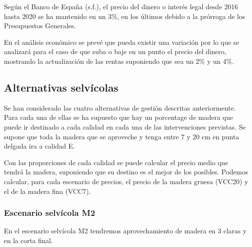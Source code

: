 \documentclass[]{article}
\begin{document}
Según el Banco de España (s.f.), el precio del dinero o interés legal
desde 2016 hasta 2020 se ha mantenido en un 3\%, en los últimos debido a
la prórroga de los Presupuestos Generales.

En el análisis económico se prevé que pueda existir una variación por lo
que se analizará para el caso de que suba o baje en un punto el precio
del dinero, mostrando la actualización de las rentas suponiendo que sea
un 2\% y un 4\%.

\subsection{Alternativas selvícolas}\label{alternativas-selvuxedcolas}

Se han considerado las cuatro alternativas de gestión descritas
anteriormente. Para cada una de ellas se ha supuesto que hay un
porcentage de madera que puede ir destinado a cada calidad en cada una
de las intervenciones previstas. Se supone que toda la madera que se
aproveche y tenga entre 7 y 20 cm en punta delgada ira a calidad E.

Con las proporciones de cada calidad se puede calcular el precio medio
que tendrá la madera, suponiendo que su destino es el mejor de los
posibles. Podemos calcular, para cada escenario de precios, el precio de
la madera gruesa (VCC20) y el de la madera fina (VCC7).

\subsubsection{Escenario selvícola M2}\label{escenario-selvuxedcola-m2}

En el escenario selvícola M2 tendremos aprovechamiento de madera en 3
claras y en la corta final.
\end{document}
